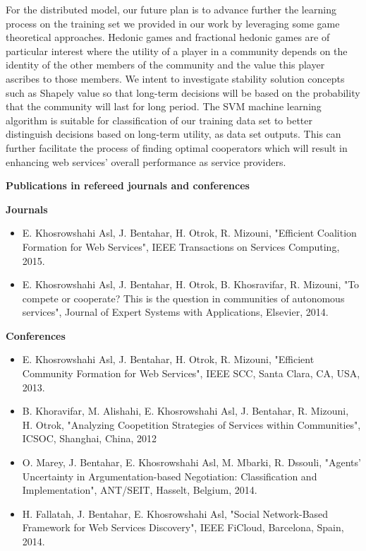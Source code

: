 For the distributed model, our future plan is to advance further the learning process on the training set we provided in our work by leveraging some game theoretical approaches. Hedonic games and fractional hedonic games \cite{Brandl:2015:FHG:2772879.2773307, Aziz_GGMT_70} are of particular interest where the utility of a player in a community depends on the identity of the other members of the community and the value this player ascribes to those members. We intent to investigate stability solution concepts such as Shapely value so that long-term decisions will be based on the probability that the community will last for long period. The SVM machine learning algorithm \cite{Osuna97trainingsupport, Cortes:1995:SN:218919.218929} is suitable for classification of our training data set to better distinguish  decisions based on long-term utility, as data set outputs. This can further facilitate the process of finding optimal cooperators which will result in enhancing web services' overall performance as service providers.

\newpage
\textbf{Publications in refereed journals and conferences}

\textbf{Journals}

\begin{itemize}
\item E. Khosrowshahi Asl, J. Bentahar, H. Otrok, R. Mizouni, "Efficient Coalition Formation for Web Services", IEEE Transactions on Services Computing, 2015.

\item E. Khosrowshahi Asl, J. Bentahar, H. Otrok, B. Khosravifar, R. Mizouni, "To compete or cooperate? This is the question in communities of autonomous services", Journal of Expert Systems with Applications, Elsevier, 2014.

\end{itemize}

\textbf{Conferences}

\begin{itemize}
\item E. Khosrowshahi Asl, J. Bentahar, H. Otrok, R. Mizouni, "Efficient Community Formation for Web Services", IEEE SCC, Santa Clara, CA, USA, 2013.

\item B. Khoravifar, M. Alishahi, E. Khosrowshahi Asl, J. Bentahar, R. Mizouni, H. Otrok, "Analyzing Coopetition Strategies of Services within Communities", ICSOC, Shanghai, China, 2012

\item O. Marey, J. Bentahar, E. Khosrowshahi Asl, M. Mbarki, R. Dssouli, "Agents' Uncertainty in Argumentation-based Negotiation: Classification and Implementation", ANT/SEIT, Hasselt, Belgium, 2014.

\item H. Fallatah, J. Bentahar, E. Khosrowshahi Asl, "Social Network-Based Framework for Web Services Discovery", IEEE  FiCloud, Barcelona, Spain, 2014.


\end{itemize}

